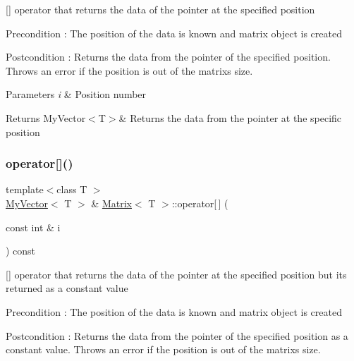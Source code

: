 \mbox{[}\mbox{]} operator that returns the data of the pointer at the specified position 

\begin{DoxyPrecond}{Precondition}
\+: The position of the data is known and matrix object is created 
\end{DoxyPrecond}
\begin{DoxyPostcond}{Postcondition}
\+: Returns the data from the pointer of the specified position. Throws an error if the position is out of the matrix\textquotesingle{}s size. 
\end{DoxyPostcond}

\begin{DoxyParams}{Parameters}
{\em i} & Position number \\
\hline
\end{DoxyParams}
\begin{DoxyReturn}{Returns}
My\+Vector$<$\+T$>$\& Returns the data from the pointer at the specific position 
\end{DoxyReturn}
\mbox{\label{class_matrix_a56c7f18f272e74bee2b616eba702fc87}} 
\subsubsection{\texorpdfstring{operator[]()}{operator[]()}\hspace{0.1cm}{\footnotesize\ttfamily [2/2]}}
{\footnotesize\ttfamily template$<$class T $>$ \\
\mbox{\hyperlink{class_my_vector}{My\+Vector}}$<$ T $>$ \& \mbox{\hyperlink{class_matrix}{Matrix}}$<$ T $>$\+::operator\mbox{[}$\,$\mbox{]} (\begin{DoxyParamCaption}\item[{const int \&}]{i }\end{DoxyParamCaption}) const}



\mbox{[}\mbox{]} operator that returns the data of the pointer at the specified position but its returned as a constant value 

\begin{DoxyPrecond}{Precondition}
\+: The position of the data is known and matrix object is created 
\end{DoxyPrecond}
\begin{DoxyPostcond}{Postcondition}
\+: Returns the data from the pointer of the specified position as a constant value. Throws an error if the position is out of the matrix\textquotesingle{}s size. 
\end{DoxyPostcond}

